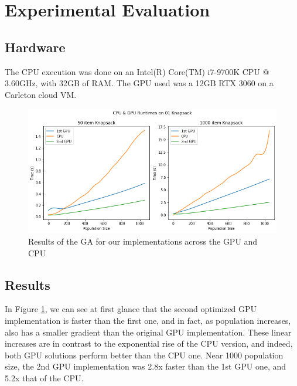 \documentclass[11pt]{article}       %
\begin{document}
\section{Experimental Evaluation} \label{expeval}

\subsection{Hardware}
The CPU execution was done on an Intel(R) Core(TM) i7-9700K CPU @ 3.60GHz, with 32GB of RAM. The GPU used was a 12GB RTX 3060 on a Carleton cloud VM.

\begin{figure}[h]
    \centering
    \includegraphics[width=\linewidth]{Figures/cpu_gpu_runtimes.png}
    \caption{Results of the GA for our implementations across the GPU and CPU}
    \label{fig:runtime}
\end{figure}

\subsection{Results}
In Figure \ref{fig:runtime}, we can see at first glance that the second optimized GPU implementation is faster than the first one, and in fact, as population increases, also has a smaller gradient than the original GPU implementation. These linear increases are in contrast to the exponential rise of the CPU version, and indeed, both GPU solutions perform better than the CPU one. Near 1000 population size, the 2nd GPU implementation was 2.8x faster than the 1st GPU one, and 5.2x that of the CPU.
\end{document}
